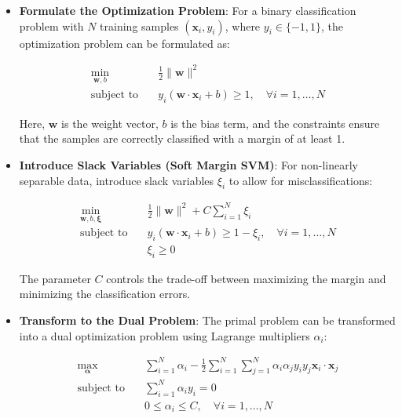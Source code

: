 \begin{itemize}
    \item \textbf{Formulate the Optimization Problem}:
    For a binary classification problem with \(N\) training samples \((\mathbf{x}_i, y_i)\), where \(y_i \in \{-1, 1\}\), the optimization problem can be formulated as:
    
    \begin{align}
        \min_{\mathbf{w}, b} \quad & \frac{1}{2} \|\mathbf{w}\|^2 \\
        \text{subject to} \quad & y_i (\mathbf{w} \cdot \mathbf{x}_i + b) \geq 1, \quad \forall i = 1, \ldots, N
    \end{align}
    
    Here, \(\mathbf{w}\) is the weight vector, \(b\) is the bias term, and the constraints ensure that the samples are correctly classified with a margin of at least 1.

    \item \textbf{Introduce Slack Variables (Soft Margin SVM)}:
    For non-linearly separable data, introduce slack variables \(\xi_i\) to allow for misclassifications:
    
    \begin{align}
        \min_{\mathbf{w}, b, \boldsymbol{\xi}} \quad & \frac{1}{2} \|\mathbf{w}\|^2 + C \sum_{i=1}^{N} \xi_i \\
        \text{subject to} \quad & y_i (\mathbf{w} \cdot \mathbf{x}_i + b) \geq 1 - \xi_i, \quad \forall i = 1, \ldots, N \\
        & \xi_i \geq 0
    \end{align}
    
    The parameter \(C\) controls the trade-off between maximizing the margin and minimizing the classification errors.

    \item \textbf{Transform to the Dual Problem}:
    The primal problem can be transformed into a dual optimization problem using Lagrange multipliers \(\alpha_i\):
    
    \begin{align}
        \max_{\boldsymbol{\alpha}} \quad & \sum_{i=1}^{N} \alpha_i - \frac{1}{2} \sum_{i=1}^{N} \sum_{j=1}^{N} \alpha_i \alpha_j y_i y_j \mathbf{x}_i \cdot \mathbf{x}_j \\
        \text{subject to} \quad & \sum_{i=1}^{N} \alpha_i y_i = 0 \\
        & 0 \leq \alpha_i \leq C, \quad \forall i = 1, \ldots, N
    \end{align}


\end{itemize}
